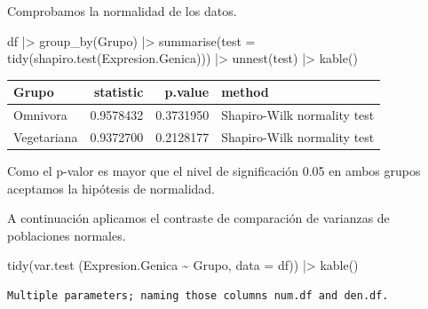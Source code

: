 \documentclass[
  spanish,
  a4paper,
]{scrreport}
\newenvironment{Shaded}{\begin{snugshade}}{\end{snugshade}}
\newcommand{\AttributeTok}[1]{\textcolor[rgb]{0.40,0.45,0.13}{#1}}
\newcommand{\FunctionTok}[1]{\textcolor[rgb]{0.28,0.35,0.67}{#1}}
\newcommand{\NormalTok}[1]{\textcolor[rgb]{0.00,0.23,0.31}{#1}}
\newcommand{\SpecialCharTok}[1]{\textcolor[rgb]{0.37,0.37,0.37}{#1}}
\newcounter{none} %
\theoremstyle{definition}
\theoremstyle{remark}
\begin{document}
\begin{tcolorbox}
Comprobamos la normalidad de los datos.

\begin{Shaded}
\begin{Highlighting}[]
\NormalTok{df }\SpecialCharTok{|\textgreater{}} 
    \FunctionTok{group\_by}\NormalTok{(Grupo) }\SpecialCharTok{|\textgreater{}} 
    \FunctionTok{summarise}\NormalTok{(}\AttributeTok{test =} \FunctionTok{tidy}\NormalTok{(}\FunctionTok{shapiro.test}\NormalTok{(Expresion.Genica))) }\SpecialCharTok{|\textgreater{}} 
    \FunctionTok{unnest}\NormalTok{(test) }\SpecialCharTok{|\textgreater{}} 
    \FunctionTok{kable}\NormalTok{()}
\end{Highlighting}
\end{Shaded}

{\def\LTcaptype{none} %
\begin{longtable}[]{@{}lrrl@{}}
\toprule\noalign{}
Grupo & statistic & p.value & method \\
\midrule\noalign{}
\endhead
\bottomrule\noalign{}
\endlastfoot
Omnivora & 0.9578432 & 0.3731950 & Shapiro-Wilk normality test \\
Vegetariana & 0.9372700 & 0.2128177 & Shapiro-Wilk normality test \\
\end{longtable}
}

Como el p-valor es mayor que el nivel de significación 0.05 en ambos
grupos aceptamos la hipótesis de normalidad.

A continuación aplicamos el contraste de comparación de varianzas de
poblaciones normales.

\begin{Shaded}
\begin{Highlighting}[]
\FunctionTok{tidy}\NormalTok{(}\FunctionTok{var.test}\NormalTok{ (Expresion.Genica }\SpecialCharTok{\textasciitilde{}}\NormalTok{ Grupo, }\AttributeTok{data =}\NormalTok{ df)) }\SpecialCharTok{|\textgreater{}} 
    \FunctionTok{kable}\NormalTok{()}
\end{Highlighting}
\end{Shaded}

\begin{verbatim}
Multiple parameters; naming those columns num.df and den.df.
\end{verbatim}


\end{tcolorbox}
\end{document}
